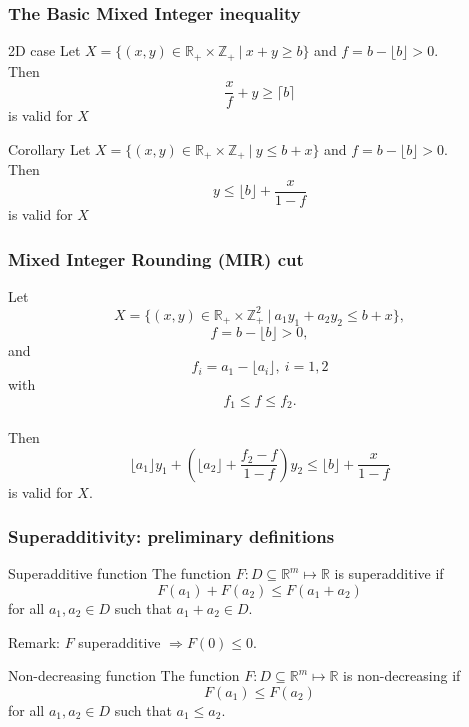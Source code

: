 \documentclass[9pt,handout]{beamer}
\begin{document}
 \begin{frame} \frametitle{The Basic Mixed Integer inequality}

   \begin{block} {2D case}
     Let $X = \{ (x,y) \in \mathbb{R}_+ \times \mathbb{Z}_+ \ | \ x + y \geq b\}$ and $f= b - \lfloor b \rfloor > 0$. \\
     Then $$\frac{x}{f} + y \geq \lceil b \rceil$$ is valid for $X$
   \end{block}
  
      \begin{block} {Corollary}
     Let $X = \{ (x,y) \in \mathbb{R}_+ \times \mathbb{Z}_+ \ | \ y \leq b + x\}$ and $f= b - \lfloor b \rfloor > 0$. \\
     Then $$y \leq \lfloor b \rfloor + \frac{x}{1-f}$$ is valid for $X$
   \end{block}

 \end{frame}

 \begin{frame} \frametitle{Mixed Integer Rounding (MIR) cut}
      \begin{block} {}
     Let $$X = \{ (x,y) \in \mathbb{R}_+ \times \mathbb{Z}^2_+ \ | \ a_1y_1 + a_2y_2 \leq b + x\},$$  $$f= b - \lfloor b \rfloor > 0,$$ and $$f_i= a_1 - \lfloor a_i \rfloor, \ i=1,2$$ with $$f_1 \leq f \leq f_2.$$  \\
     Then $$\lfloor a_1 \rfloor y_1 + \left(\lfloor a_2 \rfloor + \frac{f_2-f}{1-f} \right) y_2 \leq \lfloor b \rfloor + \frac{x}{1-f}$$ is valid for $X$.
   \end{block}
 \end{frame}

 \begin{frame} \frametitle{Superadditivity: preliminary definitions}
   \begin{block} {Superadditive function}
     The function $F : D \subseteq \mathbb{R}^m \mapsto \mathbb{R}$ is superadditive if 
     $$ F(a_1) + F(a_2) \leq F(a_1+a_2)$$
     for all $a_1, a_2 \in D$ such that $a_1+a_2 \in D$.
   \end{block}
   Remark: $F$ superadditive $\Rightarrow F(0) \leq 0$.

   \begin{block} {Non-decreasing function}
     The function $F : D \subseteq \mathbb{R}^m \mapsto \mathbb{R}$ is non-decreasing if 
     $$ F(a_1) \leq F(a_2)$$ for all $a_1, a_2 \in D$ such that $a_1 \leq a_2$.
   \end{block}
 \end{frame}
\end{document}
